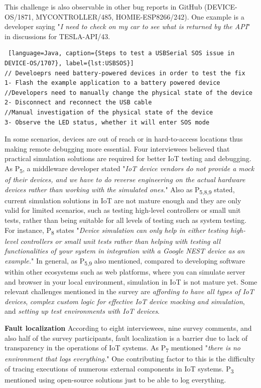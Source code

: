 {This challenge is also observable in other bug reports in GitHub (DEVICE-OS/1871, MYCONTROLLER/485, HOMIE-ESP8266/242). 
One example is a developer saying "\emph{I need to check on my car to see what is returned by the API}" in discussions for TESLA-API/43.

 \begin{lstlisting} [language=Java, caption={Steps to test a USBSerial SOS issue in DEVICE-OS/1707}, label={lst:USBSOS}] 
// Develoeprs need battery-powered devices in order to test the fix
1- Flash the example application to a battery powered device
//Developers need to manually change the physical state of the device
2- Disconnect and reconnect the USB cable
//Manual investigation of the physical state of the device
3- Observe the LED status, whether it will enter SOS mode
\end{lstlisting}

In some scenarios, devices are out of reach or in hard-to-access locations thus making remote debugging more essential. 
Four interviewees believed that practical simulation solutions are required for better IoT testing and debugging. As P\textsubscript{5}, a middleware developer stated "\emph{IoT device vendors do not provide a mock of their devices, and we have to do reverse engineering on the actual hardware devices rather than working with the simulated ones.}" Also as P\textsubscript{5,8,9} stated, current simulation solutions in IoT are not mature enough and they are only valid for limited scenarios, such as testing high-level controllers or small unit tests, rather than being suitable for all levels of testing such as system testing.
 For instance, P\textsubscript{8} states "\emph{Device simulation can only help in either testing high-level controllers or small unit tests rather than helping with testing all functionalities of your system in integration with a Google NEST device as an example.}"
 In general, as P\textsubscript{5,9} also mentioned, compared to developing software within other ecosystems such as web platforms, where you can simulate server and browser in your local environment, simulation in IoT is not mature yet.
Some relevant challenges mentioned in the survey are \emph{affording to have all types of IoT devices}, \emph{complex custom logic for effective IoT device mocking and simulation}, and \emph{setting up test environments with IoT devices}. 

\textbf{Fault localization}
According to eight interviewees, nine survey comments, and also half of the survey participants, fault localization is a barrier due to lack of transparency in the operations of IoT systems. As P\textsubscript{7} mentioned "\emph{there is no environment that logs everything.}" One contributing factor to this is the difficulty of tracing executions of numerous external components in IoT systems. P\textsubscript{3} mentioned using open-source solutions just to be able to log everything. 

}
